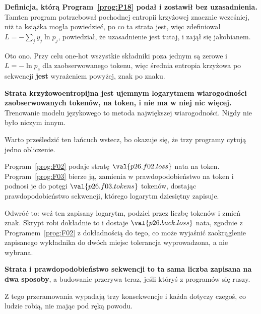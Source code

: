 \begin{fr}

\begin{note}
\textbf{Definicja, którą Program~\ref{prog:P18} podał i zostawił bez
uzasadnienia.} Tamten program potrzebował pochodnej entropii krzyżowej
znacznie wcześniej, niż ta książka mogła powiedzieć, po co ta strata jest,
więc zdefiniował $L = -\sum_j y_j \ln p_j$, powiedział, że uzasadnienie jest
tutaj, i zajął się jakobianem.

Oto ono. Przy celu one-hot wszystkie składniki poza jednym są zerowe i
$L = -\ln p_c$ dla zaobserwowanego tokenu, więc średnia entropia krzyżowa po
sekwencji \textbf{jest} wyrażeniem powyżej, znak po znaku.

\textbf{Strata krzyżowoentropijna jest ujemnym logarytmem wiarogodności
zaobserwowanych tokenów, na token, i nie ma w niej nic więcej.} Trenowanie
modelu językowego to metoda największej wiarogodności. Nigdy nie było niczym
innym.
\end{note}
\end{fr}

\begin{fr}
Warto prześledzić ten łańcuch wstecz, bo okazuje się, że trzy programy cytują
jedno obliczenie.

Program~\ref{prog:F02} podaje stratę $\val{p26.f02.loss}$ nata na token.
Program~\ref{prog:F03} bierze ją, zamienia w prawdopodobieństwo na token i
podnosi je do potęgi $\val{p26.f03.tokens}$ tokenów, dostając
prawdopodobieństwo sekwencji, którego logarytm dziesiętny zapisuje.

Odwróć to: weź ten zapisany logarytm, podziel przez liczbę tokenów i zmień
znak. Skrypt robi dokładnie to i dostaje $\val{p26.back.loss}$ nata, zgodnie z
Programem~\ref{prog:F02} z dokładnością do tego, co może wyjaśnić
zaokrąglenie zapisanego wykładnika do dwóch miejsc \dash{} tolerancja
wyprowadzona, a nie wybrana.

\textbf{Strata i prawdopodobieństwo sekwencji to ta sama liczba zapisana na
dwa sposoby}, a budowanie przerywa teraz, jeśli któryś z programów się
ruszy.
\end{fr}

\begin{fr}

Z tego przeramowania wypadają trzy konsekwencje i każda dotyczy czegoś, co
ludzie robią, nie mając pod ręką powodu.
\end{fr}

